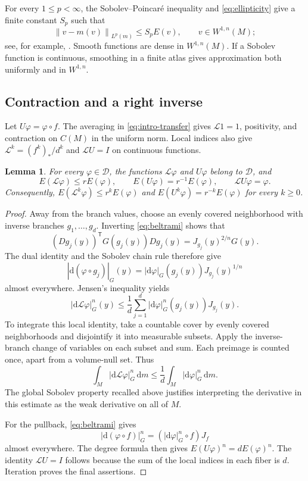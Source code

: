 \documentclass[11pt,reqno]{amsart}
\theoremstyle{plain}
\newtheorem{lemma}[theorem]{Lemma}
\theoremstyle{definition}
\theoremstyle{remark}
\newcommand{\Lop}{\mathcal L}
\newcommand{\Dcal}{\mathcal D}
\newcommand{\norm}[1]{\left\lVert #1\right\rVert}
\newcommand{\dd}{\mathrm d}
\numberwithin{equation}{section}
\begin{document}
For every $1\le p<\infty$, the Sobolev--Poincar\'e inequality and \eqref{eq:ellipticity} give a finite constant $S_p$ such that
\begin{equation}\label{eq:sobolev-poincare}
 \norm{v-m(v)}_{L^p(m)}\le S_p E(v),\qquad v\in W^{1,n}(M);
\end{equation}
see, for example, \cite[Chapter 2]{Hebey00}. Smooth functions are dense in $W^{1,n}(M)$. If a Sobolev function is continuous, smoothing in a finite atlas gives approximation both uniformly and in $W^{1,n}$.

\subsection{Contraction and a right inverse}

Let $U\varphi=\varphi\circ f$. The averaging in \eqref{eq:intro-transfer} gives $\Lop1=1$, positivity, and contraction on $C(M)$ in the uniform norm. Local indices also give $\Lop^k=(f^k)_*/d^k$ and $\Lop U=I$ on continuous functions.

\begin{lemma}\label{lem:energy}
For every $\varphi\in\Dcal$, the functions $\Lop\varphi$ and $U\varphi$ belong to $\Dcal$, and
\begin{equation}\label{eq:energy-pair}
 E(\Lop\varphi)\le rE(\varphi),
 \qquad E(U\varphi)=r^{-1}E(\varphi),
 \qquad \Lop U\varphi=\varphi.
\end{equation}
Consequently, $E(\Lop^k\varphi)\le r^kE(\varphi)$ and $E(U^k\varphi)=r^{-k}E(\varphi)$ for every $k\ge0$.
\end{lemma}

\begin{proof}
Away from the branch values, choose an evenly covered neighborhood with inverse branches $g_1,\ldots,g_d$. Inverting \eqref{eq:beltrami} shows that
\[
 (Dg_j(y))^{\mathsf T}G(g_j(y))Dg_j(y)
 =J_{g_j}(y)^{2/n}G(y).
\]
The dual identity and the Sobolev chain rule therefore give
\[
 |\dd(\varphi\circ g_j)|_G(y)
 =|\dd\varphi|_G(g_j(y))J_{g_j}(y)^{1/n}
\]
almost everywhere. Jensen's inequality yields
\begin{equation}\label{eq:pointwise-transfer}
 |\dd\Lop\varphi|_G^n(y)
 \le\frac1d\sum_{j=1}^d
 |\dd\varphi|_G^n(g_j(y))J_{g_j}(y).
\end{equation}
To integrate this local identity, take a countable cover by evenly covered neighborhoods and disjointify it into measurable subsets. Apply the inverse-branch change of variables on each subset and sum. Each preimage is counted once, apart from a volume-null set. Thus
\[
 \int_M|\dd\Lop\varphi|_G^n\,\dd m
 \le\frac1d\int_M|\dd\varphi|_G^n\,\dd m.
\]
The global Sobolev property recalled above justifies interpreting the derivative in this estimate as the weak derivative on all of $M$.

For the pullback, \eqref{eq:beltrami} gives
\[
 |\dd(\varphi\circ f)|_G^n
 =(|\dd\varphi|_G^n\circ f)J_f
\]
almost everywhere. The degree formula then gives $E(U\varphi)^n=dE(\varphi)^n$. The identity $\Lop U=I$ follows because the sum of the local indices in each fiber is $d$. Iteration proves the final assertions.
\end{proof}
\end{document}
